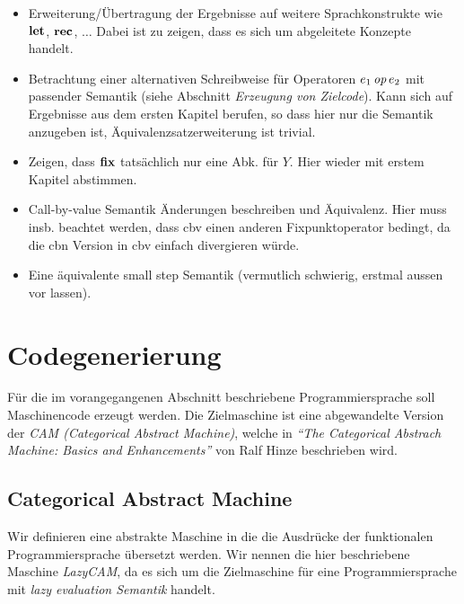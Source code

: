 \documentclass[12pt,fleqn,a4paper]{article}
\begin{document}
\begin{itemize}
\item Erweiterung/\"Ubertragung der Ergebnisse auf weitere Sprachkonstrukte wie $\mathbf{let}$, $\mathbf{rec}$, $\ldots$
  Dabei ist zu zeigen, dass es sich um abgeleitete Konzepte handelt.
\item Betrachtung einer alternativen Schreibweise f\"ur Operatoren $e_1\,{\text{\it op\/}}\,e_2$ mit passender Semantik
  (siehe Abschnitt {\em Erzeugung von Zielcode}). Kann sich auf Ergebnisse aus dem ersten Kapitel berufen, so dass hier
  nur die Semantik anzugeben ist, \"Aquivalenzsatzerweiterung ist trivial.
\item Zeigen, dass $\mathbf{fix}$ tats\"achlich nur eine Abk. f\"ur $Y$. Hier wieder mit erstem Kapitel abstimmen.
\item Call-by-value Semantik \"Anderungen beschreiben und \"Aquivalenz. Hier muss insb. beachtet werden, dass
  cbv einen anderen Fixpunktoperator bedingt, da die cbn Version in cbv einfach divergieren w\"urde.
\item Eine \"aquivalente small step Semantik (vermutlich schwierig, erstmal aussen vor lassen).
\end{itemize}


\section{Codegenerierung}

F\"ur die im vorangegangenen Abschnitt beschriebene Programmiersprache soll Maschinencode erzeugt werden. Die
Zielmaschine ist eine abgewandelte Version der {\em CAM (Categorical Abstract Machine)}, welche in {\em ``The
Categorical Abstrach Machine: Basics and Enhancements''} von Ralf Hinze beschrieben wird.


\subsection{Categorical Abstract Machine}

Wir definieren eine abstrakte Maschine in die die Ausdr\"ucke der funktionalen Programmiersprache \"ubersetzt
werden. Wir nennen die hier beschriebene Maschine {\em LazyCAM}, da es sich um die Zielmaschine f\"ur eine
Programmiersprache mit {\em lazy evaluation Semantik} handelt.
\end{document}
